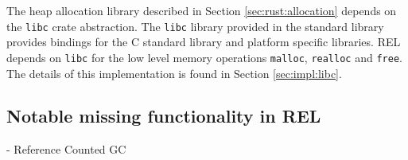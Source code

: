 The heap allocation library described in Section \ref{sec:rust:allocation} depends on the \texttt{libc} crate abstraction.
The \texttt{libc} library provided in the standard library provides bindings for the C standard library and platform specific libraries.
REL depends on \texttt{libc} for the low level memory operations \texttt{malloc}, \texttt{realloc} and \texttt{free}.
The details of this implementation is found in Section \ref{sec:impl:libc}. 

\subsection{Notable missing functionality in REL}

- Reference Counted GC

